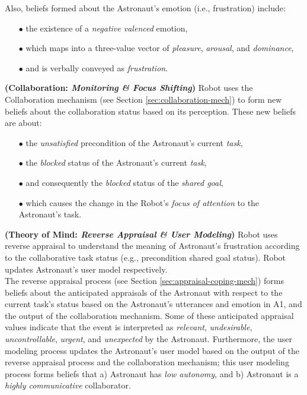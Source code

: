 \noindent Also, beliefs formed about the Astronaut's emotion (i.e., frustration)
include:

\begin{itemize}
  \item[$\bullet$] the existence of a \textit{negative valenced} emotion,
  \item[$\bullet$] which maps into a three-value vector of \textit{pleasure},
  \textit{arousal}, and \textit{dominance},
  \item[$\bullet$] and is verbally conveyed as \textit{frustration}.\\
\end{itemize}

\noindent\textbf{(Collaboration: \textit{Monitoring \& Focus Shifting})} Robot
uses the Collaboration mechanism (see Section \ref{sec:collaboration-mech}) to
form new beliefs about the collaboration status based on its perception. These
new beliefs are about:

\begin{itemize}
  \item[$\bullet$] the \textit{unsatisfied} precondition of the Astronaut's
  current \textit{task},
  \item[$\bullet$] the \textit{blocked} status of the Astronaut's current
  \textit{task},
  \item[$\bullet$] and consequently the \textit{blocked} status of the
  \textit{shared goal},
  \item[$\bullet$] which causes the change in the Robot's \textit{focus of
  attention} to the Astronaut's task.
\end{itemize}

\noindent\item \textbf{(Theory of Mind: \textit{Reverse Appraisal \& User
Modeling})} Robot uses reverse appraisal to understand the meaning of
Astronaut's frustration according to the collaborative task status (e.g.,
precondition shared goal status). Robot updates Astronaut's user model
respectively.\\

The reverse appraisal process (see Section \ref{sec:appraisal-coping-mech})
forms beliefs about the anticipated appraisals of the Astronaut with respect to
the current task's status based on the Astronaut's utterances and emotion in A1,
and the output of the collaboration mechanism. Some of these anticipated
appraisal values indicate that the event is interpreted as \textit{relevant},
\textit{undesirable}, \textit{uncontrollable}, \textit{urgent}, and
\textit{unexpected} by the Astronaut. Furthermore, the user modeling process
updates the Astronaut's user model based on the output of the reverse appraisal
process and the collaboration mechanism; this user modeling process forms
beliefs that a) Astronaut has \textit{low autonomy}, and b) Astronaut is a
\textit{highly communicative} collaborator.\\

